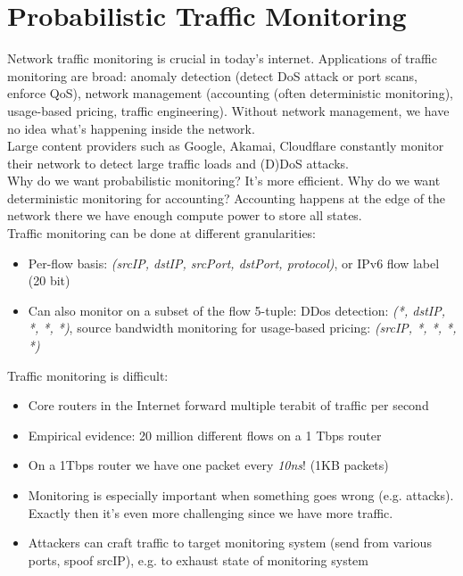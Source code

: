\section{Probabilistic Traffic Monitoring}

Network traffic monitoring is crucial in today's internet. Applications of traffic monitoring are broad: anomaly detection (detect DoS attack or port scans, enforce QoS), network management (accounting (often deterministic monitoring), usage-based pricing, traffic engineering). Without network management, we have no idea what's happening inside the network.\\
Large content providers such as Google, Akamai, Cloudflare constantly monitor their network to detect large traffic loads and (D)DoS attacks.\\
Why do we want probabilistic monitoring? It's more efficient.
Why do we want deterministic monitoring for accounting? Accounting happens at the edge of the network there we have enough compute power to store all states.\\

Traffic monitoring can be done at different granularities:

\begin{itemize}

	\item Per-flow basis: \textit{(srcIP, dstIP, srcPort, dstPort, protocol)}, or IPv6 flow label (20 bit)
	\item Can also monitor on a subset of the flow 5-tuple: DDos detection: \textit{(*, dstIP, *, *, *)}, source bandwidth monitoring for usage-based pricing: \textit{(srcIP, *, *, *, *)}
\end{itemize}


Traffic monitoring is difficult:

\begin{itemize}
	\item Core routers in the Internet forward multiple	terabit of traffic per second
	\item Empirical evidence: 20 million different flows on	a 1 Tbps router
	\item On a 1Tbps router we have one packet every \textit{10ns}! (1KB packets)
	\item Monitoring is especially important when something goes wrong (e.g. attacks). Exactly then it's even more challenging since we have more traffic.
	\item Attackers can craft traffic to target monitoring system (send from various ports, spoof srcIP), e.g. to exhaust state of monitoring system
\end{itemize}

